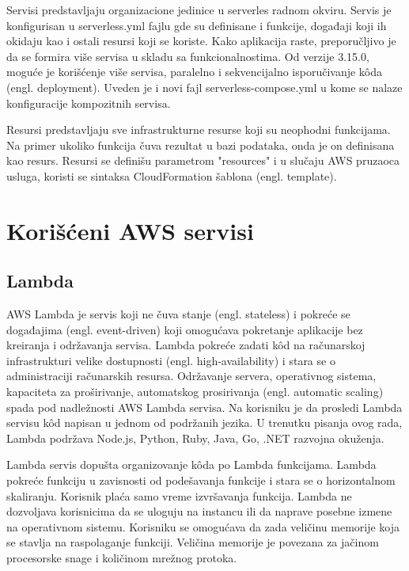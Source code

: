 \documentclass[12pt,oneside]{memoir}
\begin{document}
Servisi predstavljaju organizacione jedinice u serverles radnom okviru. Servis je konfigurisan u serverless.yml fajlu gde su definisane i funkcije, događaji koji ih okidaju kao i ostali resursi koji se koriste. Kako aplikacija raste, preporučljivo je da se formira više servisa u skladu sa funkcionalnostima\cite{sfs}. Od verzije 3.15.0, moguće je korišćenje više servisa, paralelno i sekvencijalno isporučivanje kôda (engl. deployment). Uveden je i novi fajl serverless-compose.yml u kome se nalaze konfiguracije kompozitnih servisa.
 
Resursi predstavljaju sve infrastrukturne resurse koji su neophodni funkcijama. Na primer ukoliko funkcija čuva rezultat u bazi podataka, onda je on definisana kao resurs. Resursi se definišu parametrom "resources" i u slučaju AWS pruzaoca usluga, koristi se sintaksa CloudFormation šablona (engl. template).

\section{Korišćeni AWS servisi}
\subsection{Lambda}
 
AWS Lambda je servis koji ne čuva stanje (engl. stateless) i pokreće se događajima (engl. event-driven) koji omogućava pokretanje aplikacije bez kreiranja i održavanja servisa. Lambda pokreće zadati kôd na računarskoj infrastrukturi velike dostupnosti (engl. high-availability) i stara se o administraciji računarskih resursa. Održavanje servera, operativnog sistema, kapaciteta za proširivanje, automatskog prosirivanja (engl. automatic scaling) spada pod nadležnosti AWS Lambda servisa. Na korisniku je da prosledi Lambda servisu kôd napisan u jednom od podržanih jezika. U trenutku pisanja ovog rada, Lambda podržava Node.js, Python, Ruby, Java, Go, .NET razvojna okuženja\cite{lr}.
 
Lambda servis dopušta organizovanje kôda po Lambda funkcijama. Lambda pokreće funkciju u zavisnosti od podešavanja funkcije i stara se o horizontalnom skaliranju. Korisnik plaća samo vreme izvršavanja funkcija. Lambda ne dozvoljava korisnicima da se uloguju na instancu ili da naprave posebne izmene na operativnom sistemu. Korisniku se omogućava da zada veličinu memorije koja se stavlja na raspolaganje funkciji. Veličina memorije je povezana za jačinom procesorske snage i količinom mrežnog protoka.
 
\end{document}
